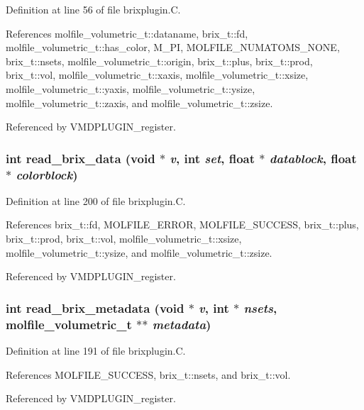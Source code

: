Definition at line 56 of file brixplugin.C.

References molfile\_\-volumetric\_\-t::dataname, brix\_\-t::fd, molfile\_\-volumetric\_\-t::has\_\-color, M\_\-PI, MOLFILE\_\-NUMATOMS\_\-NONE, brix\_\-t::nsets, molfile\_\-volumetric\_\-t::origin, brix\_\-t::plus, brix\_\-t::prod, brix\_\-t::vol, molfile\_\-volumetric\_\-t::xaxis, molfile\_\-volumetric\_\-t::xsize, molfile\_\-volumetric\_\-t::yaxis, molfile\_\-volumetric\_\-t::ysize, molfile\_\-volumetric\_\-t::zaxis, and molfile\_\-volumetric\_\-t::zsize.

Referenced by VMDPLUGIN\_\-register.
\subsubsection{\setlength{\rightskip}{0pt plus 5cm}int read\_\-brix\_\-data (void $\ast$ {\em v}, int {\em set}, float $\ast$ {\em datablock}, float $\ast$ {\em colorblock})\hspace{0.3cm}{\tt  [static]}}\label{brixplugin_8C_a4}




Definition at line 200 of file brixplugin.C.

References brix\_\-t::fd, MOLFILE\_\-ERROR, MOLFILE\_\-SUCCESS, brix\_\-t::plus, brix\_\-t::prod, brix\_\-t::vol, molfile\_\-volumetric\_\-t::xsize, molfile\_\-volumetric\_\-t::ysize, and molfile\_\-volumetric\_\-t::zsize.

Referenced by VMDPLUGIN\_\-register.
\subsubsection{\setlength{\rightskip}{0pt plus 5cm}int read\_\-brix\_\-metadata (void $\ast$ {\em v}, int $\ast$ {\em nsets}, {\bf molfile\_\-volumetric\_\-t} $\ast$$\ast$ {\em metadata})\hspace{0.3cm}{\tt  [static]}}\label{brixplugin_8C_a3}




Definition at line 191 of file brixplugin.C.

References MOLFILE\_\-SUCCESS, brix\_\-t::nsets, and brix\_\-t::vol.

Referenced by VMDPLUGIN\_\-register.
